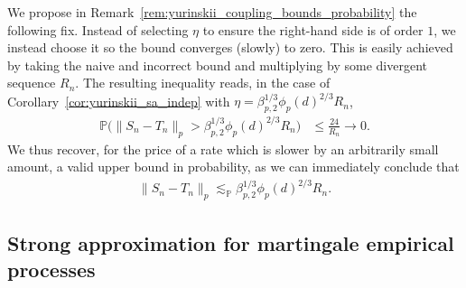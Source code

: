 \documentclass[11pt,lof]{puthesis}
\renewcommand{\P}{\ensuremath{\mathbb{P}}}
\theoremstyle{break}
\theoremstyle{proof}
\begin{document}
We propose in Remark~\ref{rem:yurinskii_coupling_bounds_probability} the
following fix.
Instead of selecting $\eta$ to ensure the right-hand side is of order $1$,
we instead choose it so the bound converges (slowly) to zero. This is
easily achieved by taking the naive and incorrect bound and multiplying
by some divergent sequence $R_n$. The resulting inequality reads,
in the case of Corollary~\ref{cor:yurinskii_sa_indep} with
$\eta = \beta_{p,2}^{1/3} \phi_p(d)^{2/3} R_n$,
%
\begin{align*}
\P\Big(\|S_n-T_n\|_p >
\beta_{p,2}^{1/3} \phi_p(d)^{2/3} R_n
\Big)
&\leq
\frac{24}{R_n}
\to 0.
\end{align*}
%
We thus recover, for the price of a rate which is slower by an arbitrarily
small amount, a valid upper bound in probability, as we can immediately
conclude that
%
\begin{align*}
\|S_n-T_n\|_p
\lesssim_\P
\beta_{p,2}^{1/3} \phi_p(d)^{2/3} R_n.
\end{align*}

\subsection{Strong approximation for martingale empirical processes}
\end{document}
